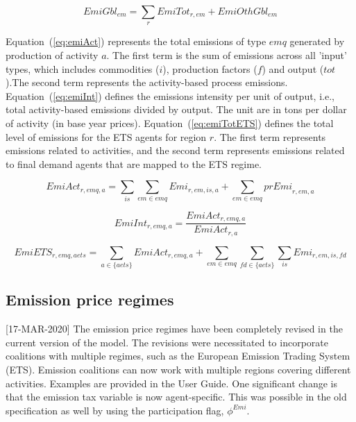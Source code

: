 \documentclass[11pt,letterpaper]{report}
\begin{document}
\begin{equation}
\label{eq:emigbl}
\mathit{EmiGbl}_{\mathit{em}} =
   \displaystyle \sum_{\mathit{r}} {
      \mathit{EmiTot}_{r,\mathit{em}}
   }
   + \mathit{EmiOthGbl}_{\mathit{em}}
\end{equation}

Equation~(\ref{eq:emiAct}) represents the total emissions of type $\mathit{emq}$
generated by production of activity $a$. The first term is
the sum of emissions across all 'input' types, which
includes commodities ($i$), production factors ($f$) and output
($\mathit{tot}$).The second term represents the activity-based
process emissions.
Equation~(\ref{eq:emiInt}) defines the emissions intensity
per unit of output, i.e., total activity-based emissions
divided by output. The unit are in tons per dollar of activity (in base
year prices). Equation~(\ref{eq:emiTotETS}) defines the total level of
emissions for the ETS agents for region $r$. The first term represents
emissions related to activities, and the second term represents
emissions related to final demand agents that are mapped to the ETS regime.

\begin{equation}
\label{eq:emiAct}
\mathit{EmiAct}_{r,\mathit{emq},a} =
   \displaystyle \sum_{\mathit{is}} {\sum_{\mathit{em} \in \mathit{emq}}
        {\mathit{Emi}_{r,\mathit{em},\mathit{is},a}}
   }
   +\displaystyle  \sum_{\mathit{em} \in \mathit{emq}}
           {\mathit{prEmi}_{r,\mathit{em},a}}
\end{equation}

\begin{equation}
\label{eq:emiInt}
\mathit{EmiInt}_{r,\mathit{emq},a} =
   \displaystyle \frac{\mathit{EmiAct}_{r,\mathit{emq},a}}{\mathit{EmiAct}_{r,a}}
\end{equation}

\begin{equation}
\label{eq:emiTotETS}
\mathit{EmiETS}_{r,\mathit{emq},\mathit{aets}} =
  \sum_{a \in \{aets\}}{\mathit{EmiAct}_{r,\mathit{emq},a}}
  + \sum_{\mathit{em} \in \mathit{emq}} {\sum_{\mathit{fd} \in \{aets\}}
    {\sum_{\mathit{is}}{\mathit{Emi}_{r,\mathit{em},\mathit{is},\mathit{fd}}}}}
\end{equation}


\subsection{Emission price regimes}

[17-MAR-2020] The emission price regimes have been completely revised
in the current version of the model. The revisions were necessitated
to incorporate coalitions with multiple regimes, such
as the European Emission Trading System (ETS). Emission coalitions
can now work with multiple regions covering different activities.
Examples are provided in the User Guide. One significant change
is that the emission tax variable is now agent-specific. This was
possible in the old specification as well by using the participation
flag, $\phi^{\mathit{Emi}}$.
\end{document}
